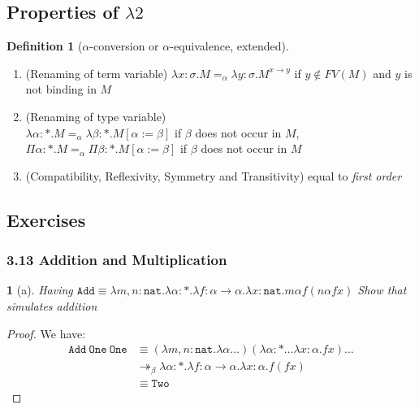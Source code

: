 \documentclass[12pt, a4paper]{article}
\newcommand{\twobeta}{\twoheadrightarrow_\beta}
\newtheorem{definition}{Definition}[section]
\newtheorem*{exercise}{}
\begin{document}
\subsection{Properties of \texorpdfstring{$\lambda2$}{}}
\begin{definition}[$\alpha$-conversion or $\alpha$-equivalence, extended]
\end{definition}
\begin{enumerate}
    \item (Renaming of term variable) $\lambda x : \sigma . M =_\alpha \lambda y : \sigma . M^{x \to y}$ if $y \notin FV(M)$ and $y$ is not binding in $M$
    \item (Renaming of type variable) \\
    $\lambda \alpha : * . M =_\alpha \lambda \beta : * . M[\alpha := \beta]$ if $\beta$ does not occur in $M$, \\
    $\Pi\alpha : * . M =_\alpha \Pi\beta : * . M[\alpha := \beta]$ if $\beta$ does not occur in $M$
    \item (Compatibility, Reflexivity, Symmetry and Transitivity) equal to \textit{first order}
\end{enumerate}

\subsection{Exercises}
\subsubsection{3.13 Addition and Multiplication}
\begin{exercise}[a]
    Having $\mathtt{Add} \equiv \lambda m,n: \mathtt{nat}. \lambda \alpha : *. \lambda f : \alpha \to \alpha. \lambda x : \mathtt{nat}. m\alpha f(n \alpha f x)$
    Show that simulates addition
\end{exercise}
\begin{proof}
    We have:
    \begin{subequations}
        \begin{align}
            \mathtt{Add\ One\ One} &\equiv (\lambda m,n: \mathtt{nat}. \lambda \alpha \dots)(\lambda \alpha : * \dots \lambda x : \alpha. f x)\dots\\
                                   &\twobeta \lambda \alpha : * . \lambda f : \alpha \to \alpha . \lambda x : \alpha . f(fx)\\
                                   &\equiv \mathtt{Two}
        \end{align}
    \end{subequations}
\end{proof}
\end{document}
